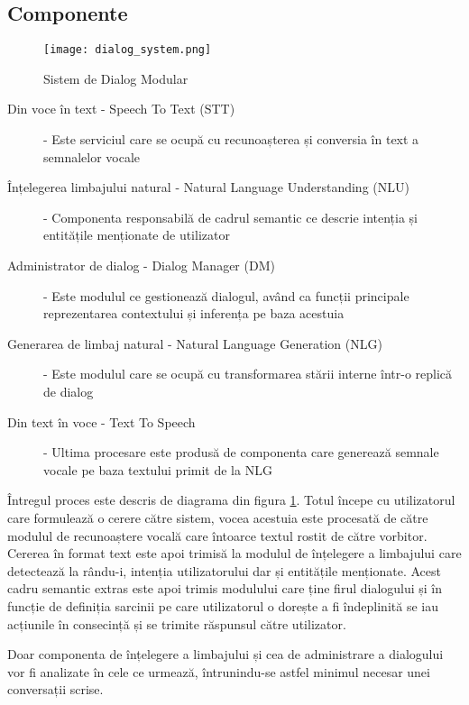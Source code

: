 \subsection{Componente}
\begin{figure}[h]
	\centering
	\texttt{[image: dialog\_system.png]}
	\caption{Sistem de Dialog Modular}
	\label{fig:ds_proc}
\end{figure}
\begin{description}
	\item[Din voce în text - Speech To Text (STT)]  - 
	Este serviciul care se ocupă cu recunoașterea și conversia în text a semnalelor vocale
	\item[Înțelegerea limbajului natural - Natural Language Understanding (NLU)] -
	Componenta responsabilă de cadrul semantic ce descrie intenția și entitățile menționate de utilizator
	\item[Administrator de dialog - Dialog Manager (DM)] - 
	Este modulul ce gestionează dialogul, având ca funcții principale reprezentarea contextului și inferența pe baza acestuia
	\item[Generarea de limbaj natural - Natural Language Generation (NLG)] -
	Este modulul care se ocupă cu transformarea stării interne într-o replică de dialog
	\item[Din text în voce - Text To Speech] - 
	Ultima procesare este produsă de componenta care generează semnale vocale pe baza textului primit de la NLG
\end{description}

Întregul proces este descris de diagrama din figura \ref{fig:ds_proc}. Totul începe cu utilizatorul care formulează o cerere către sistem, vocea acestuia este procesată de către modulul de recunoaștere vocală care întoarce textul rostit de către vorbitor. Cererea în format text este apoi trimisă la modulul de înțelegere a limbajului care detectează la rându-i, intenția utilizatorului dar și entitățile menționate. Acest cadru semantic extras este apoi trimis modulului care ține firul dialogului și în funcție de definiția sarcinii pe care utilizatorul o dorește a fi îndeplinită se iau acțiunile în consecință și se trimite răspunsul către utilizator.

Doar componenta de înțelegere a limbajului și cea de administrare a dialogului vor fi analizate în cele ce urmează, întrunindu-se astfel minimul necesar unei conversații scrise.
